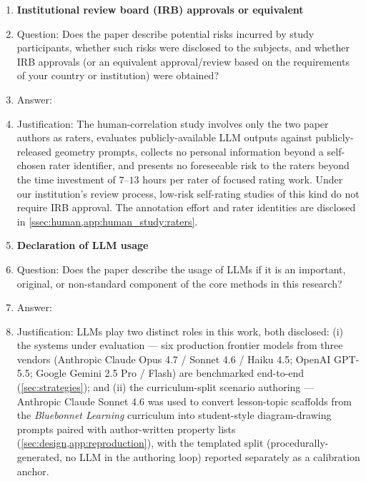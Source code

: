 \begin{enumerate}
\item {\bf Institutional review board (IRB) approvals or equivalent}
\item[] Question: Does the paper describe potential risks incurred by study participants, whether such risks were disclosed to the subjects, and whether IRB approvals (or an equivalent approval/review based on the requirements of your country or institution) were obtained?
\item[] Answer: \answerNA{}
\item[] Justification: The human-correlation study involves only the two paper authors as raters, evaluates publicly-available LLM outputs against publicly-released geometry prompts, collects no personal information beyond a self-chosen rater identifier, and presents no foreseeable risk to the raters beyond the time investment of $7$--$13$ hours per rater of focused rating work. Under our institution's review process, low-risk self-rating studies of this kind do not require IRB approval. The annotation effort and rater identities are disclosed in \cref{ssec:human,app:human_study:raters}.

\item {\bf Declaration of LLM usage}
\item[] Question: Does the paper describe the usage of LLMs if it is an important, original, or non-standard component of the core methods in this research?
\item[] Answer: \answerYes{}
\item[] Justification: LLMs play two distinct roles in this work, both disclosed: (i) the systems under evaluation --- six production frontier models from three vendors (Anthropic Claude Opus 4.7 / Sonnet 4.6 / Haiku 4.5; OpenAI GPT-5.5; Google Gemini 2.5 Pro / Flash) are benchmarked end-to-end (\cref{sec:strategies}); and (ii) the curriculum-split scenario authoring --- Anthropic Claude Sonnet 4.6 was used to convert lesson-topic scaffolds from the \emph{Bluebonnet Learning} curriculum into student-style diagram-drawing prompts paired with author-written property lists (\cref{sec:design,app:reproduction}), with the templated split (procedurally-generated, no LLM in the authoring loop) reported separately as a calibration anchor.

\end{enumerate}
